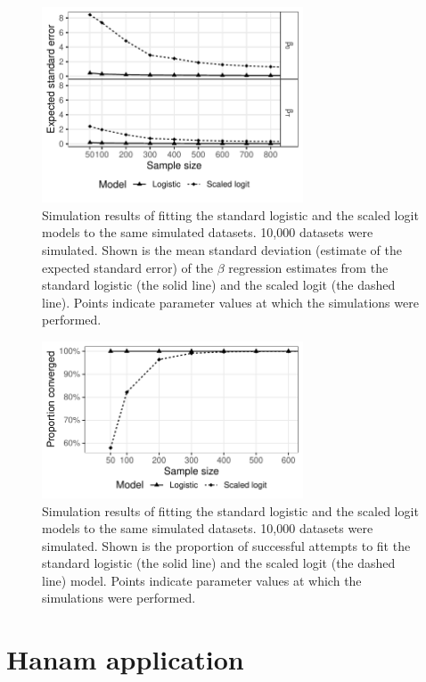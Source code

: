 \documentclass[12pt]{article}
\begin{document}
\pagebreak

\begin{figure}[htp]
	\centering
	\includegraphics[width=0.69\textwidth]{../logistic-plot/vary_nsam_se.pdf}
	\caption{
	Simulation results of fitting the standard logistic and the scaled logit models to the same simulated datasets. 10,000 datasets were simulated. Shown is the mean standard deviation (estimate of the expected standard error) of the $\beta$ regression estimates from the standard logistic (the solid line) and the scaled logit (the dashed line). Points indicate parameter values at which the simulations were performed.
	}
	\label{SclrSE}
\end{figure}

\begin{figure}[H]
	\centering
	\includegraphics[width=0.69\textwidth]{../logistic-plot/vary_nsam.pdf}
	\caption{
	Simulation results of fitting the standard logistic and the scaled logit models to the same simulated datasets. 10,000 datasets were simulated. Shown is the proportion of successful attempts to fit the standard logistic (the solid line) and the scaled logit (the dashed line) model. Points indicate parameter values at which the simulations were performed.
	}
	\label{SclrConv}
\end{figure}

\pagebreak
%
\section{Hanam application}
\end{document}

